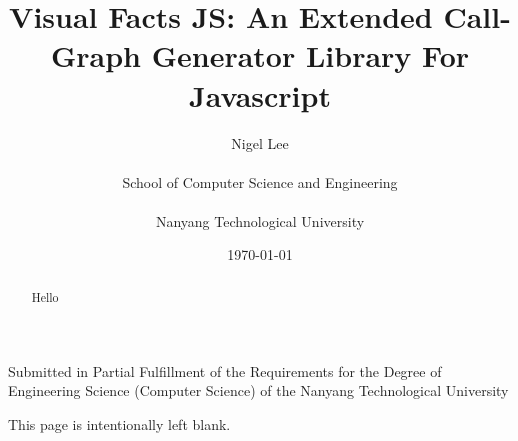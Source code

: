 \title{\Large{\textbf{Visual Facts JS: An Extended Call-Graph Generator Library For Javascript}}}
\author{Nigel Lee \\~\\ School of Computer Science and Engineering \\~\\ Nanyang Technological University}
\date{\today}
\maketitle
\thispagestyle{empty}
\newpage
\begin{center}
Submitted in Partial Fulfillment of the Requirements for the Degree of Engineering Science (Computer Science) of the Nanyang Technological University
\end{center}
\newpage
This page is intentionally left blank.
\newpage
{}
\begin{abstract}
\thispagestyle{plain}
    Hello
\end{abstract}
\tableofcontents
\setcounter{page}{2}
\newpage
